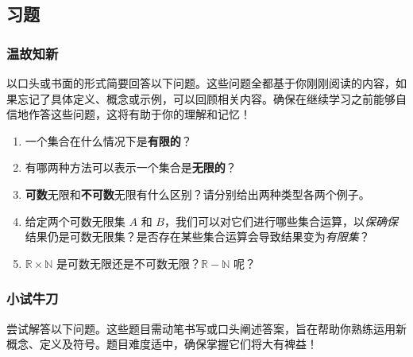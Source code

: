 
\subsection{习题}\label{sec:section7.6.5}

\subsubsection*{温故知新}

以口头或书面的形式简要回答以下问题。这些问题全都基于你刚刚阅读的内容，如果忘记了具体定义、概念或示例，可以回顾相关内容。确保在继续学习之前能够自信地作答这些问题，这将有助于你的理解和记忆！

\begin{enumerate}[label=(\arabic*)]
    \item 一个集合在什么情况下是\textbf{有限的}？
    \item 有哪两种方法可以表示一个集合是\textbf{无限的}？
    \item \textbf{可数}无限和\textbf{不可数}无限有什么区别？请分别给出两种类型各两个例子。
    \item 给定两个可数无限集 $A$ 和 $B$，我们可以对它们进行哪些集合运算，以\emph{保确保}结果仍是可数无限集？是否存在某些集合运算会导致结果变为\emph{有限集}？
    \item $\mathbb{R} \times \mathbb{N}$ 是可数无限还是不可数无限？$\mathbb{R} - \mathbb{N}$ 呢？
\end{enumerate}

\subsubsection*{小试牛刀}

尝试解答以下问题。这些题目需动笔书写或口头阐述答案，旨在帮助你熟练运用新概念、定义及符号。题目难度适中，确保掌握它们将大有裨益！

